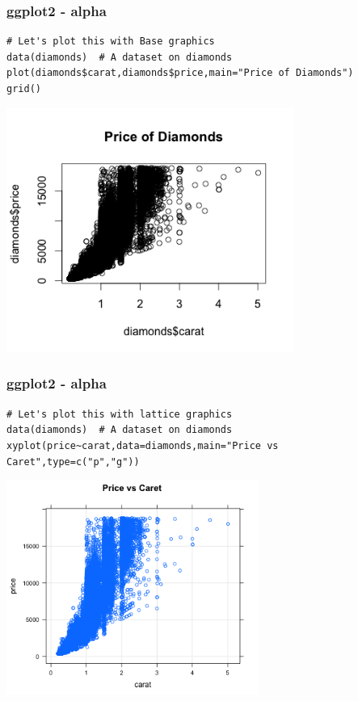 \documentclass{beamer}
\begin{document}

\begin{frame}[fragile]
\frametitle{ggplot2 - alpha}
\scriptsize
\begin{verbatim}
# Let's plot this with Base graphics
data(diamonds)  # A dataset on diamonds
plot(diamonds$carat,diamonds$price,main="Price of Diamonds")
grid()
\end{verbatim}
\begin{center}
\includegraphics[height=8cm]{../IMG/qplot_base.png}
\end{center}
\end{frame}

%
\begin{frame}[fragile]
\frametitle{ggplot2 - alpha}
\scriptsize
\begin{verbatim}
# Let's plot this with lattice graphics
data(diamonds)  # A dataset on diamonds
xyplot(price~carat,data=diamonds,main="Price vs Caret",type=c("p","g"))
\end{verbatim}
\begin{center}
\includegraphics[height=7cm]{../IMG/lattice_diamonds.png}
\end{center}
\end{frame}
%
\end{document}
